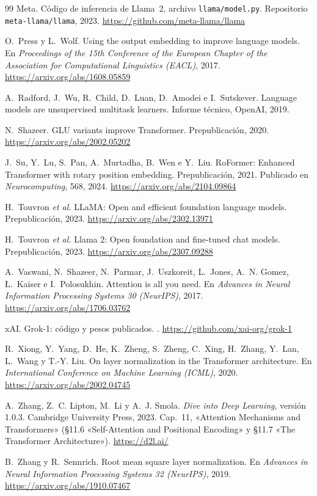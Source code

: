 \begin{thebibliography}{99}
Meta.
\newblock Código de inferencia de Llama~2, archivo \texttt{llama/model.py}.
\newblock Repositorio \texttt{meta-llama/llama}, 2023.
\newblock \url{https://github.com/meta-llama/llama}

O.~Press y L.~Wolf.
\newblock Using the output embedding to improve language models.
\newblock En \emph{Proceedings of the 15th Conference of the European Chapter of the Association for Computational Linguistics (EACL)}, 2017.
\newblock \url{https://arxiv.org/abs/1608.05859}

A.~Radford, J.~Wu, R.~Child, D.~Luan, D.~Amodei e I.~Sutskever.
\newblock Language models are unsupervised multitask learners.
\newblock Informe técnico, OpenAI, 2019.

N.~Shazeer.
\newblock GLU variants improve Transformer.
\newblock Prepublicación, 2020.
\newblock \url{https://arxiv.org/abs/2002.05202}

J.~Su, Y.~Lu, S.~Pan, A.~Murtadha, B.~Wen e Y.~Liu.
\newblock RoFormer: Enhanced Transformer with rotary position embedding.
\newblock Prepublicación, 2021. Publicado en \emph{Neurocomputing}, 568, 2024.
\newblock \url{https://arxiv.org/abs/2104.09864}

H.~Touvron \emph{et al.}
\newblock LLaMA: Open and efficient foundation language models.
\newblock Prepublicación, 2023.
\newblock \url{https://arxiv.org/abs/2302.13971}

H.~Touvron \emph{et al.}
\newblock Llama 2: Open foundation and fine-tuned chat models.
\newblock Prepublicación, 2023.
\newblock \url{https://arxiv.org/abs/2307.09288}

A.~Vaswani, N.~Shazeer, N.~Parmar, J.~Uszkoreit, L.~Jones, A.~N. Gomez, Ł.~Kaiser e I.~Polosukhin.
\newblock Attention is all you need.
\newblock En \emph{Advances in Neural Information Processing Systems 30 (NeurIPS)}, 2017.
\newblock \url{https://arxiv.org/abs/1706.03762}

xAI.
\newblock Grok-1: código y pesos publicados.
.
\newblock \url{https://github.com/xai-org/grok-1}

R.~Xiong, Y.~Yang, D.~He, K.~Zheng, S.~Zheng, C.~Xing, H.~Zhang, Y.~Lan, L.~Wang y T.-Y. Liu.
\newblock On layer normalization in the Transformer architecture.
\newblock En \emph{International Conference on Machine Learning (ICML)}, 2020.
\newblock \url{https://arxiv.org/abs/2002.04745}

A.~Zhang, Z.~C. Lipton, M.~Li y A.~J. Smola.
\newblock \emph{Dive into Deep Learning}, versión 1.0.3.
\newblock Cambridge University Press, 2023.
\newblock Cap.~11, «Attention Mechanisms and Transformers» (§11.6 «Self-Attention and Positional Encoding» y §11.7 «The Transformer Architecture»).
\newblock \url{https://d2l.ai/}

B.~Zhang y R.~Sennrich.
\newblock Root mean square layer normalization.
\newblock En \emph{Advances in Neural Information Processing Systems 32 (NeurIPS)}, 2019.
\newblock \url{https://arxiv.org/abs/1910.07467}

\end{thebibliography}
